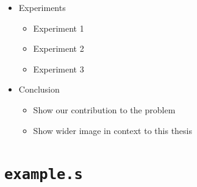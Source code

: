 \documentclass[12pt, twoside]{fithesis2}
\renewcommand{\_}{\leavevmode \kern0.07em\vbox{\hrule width0.4em}}
\newcommand{\squarebullet}{\textcolor{black}{\raisebox{0.15em}{\rule{4pt}{4pt}}}}
\newenvironment{myItemize}{
  \begin{itemize}[
    leftmargin=2em,
    rightmargin=1em,
    itemsep=\parskip,
    parsep=0em,
    topsep=0em,
    partopsep=0em
]
  \renewcommand{\labelitemi}{\squarebullet}
  \renewcommand{\labelitemii}{\textbullet}
}{
  \end{itemize}
}
\begin{document}
\begin{myItemize}
\item Experiments
    \begin{myItemize}
    \item Experiment 1
    \item Experiment 2
    \item Experiment 3
    \end{myItemize}

\item Conclusion
    \begin{myItemize}
    \item Show our contribution to the problem
    \item Show wider image in context to this thesis
    \end{myItemize}

\end{myItemize}



\chapter{\texttt{example.s}}
\label{appendix:example}
\end{document}
